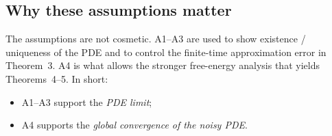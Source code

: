 \subsection*{Why these assumptions matter}
The assumptions are not cosmetic. A1--A3 are used to show existence / uniqueness of the PDE and to control the finite-time approximation error in Theorem~3. A4 is what allows the stronger free-energy analysis that yields Theorems~4--5. In short:
\begin{itemize}[leftmargin=1.5em]
\item A1--A3 support the \emph{PDE limit};
\item A4 supports the \emph{global convergence of the noisy PDE}.
\end{itemize}
